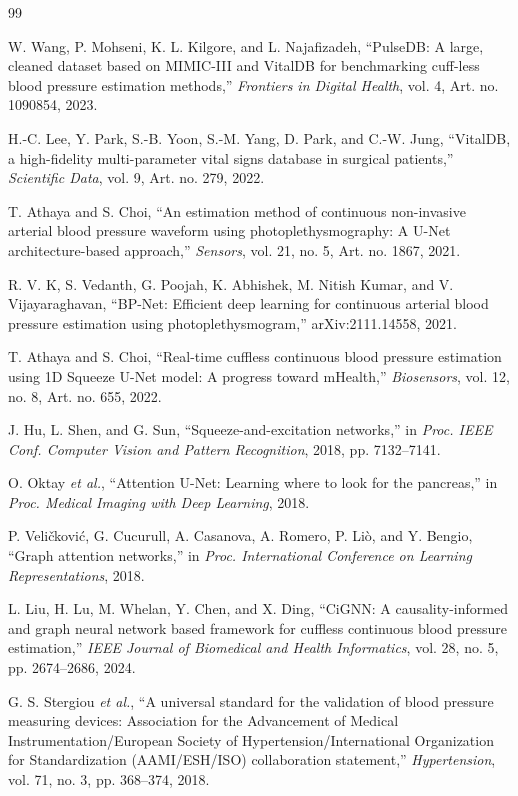\documentclass[journal,twoside,web]{ieeecolor}
\begin{document}
\begin{thebibliography}{99}

W. Wang, P. Mohseni, K. L. Kilgore, and L. Najafizadeh, ``PulseDB: A large, cleaned dataset based on MIMIC-III and VitalDB for benchmarking cuff-less blood pressure estimation methods,'' \emph{Frontiers in Digital Health}, vol. 4, Art. no. 1090854, 2023.

H.-C. Lee, Y. Park, S.-B. Yoon, S.-M. Yang, D. Park, and C.-W. Jung, ``VitalDB, a high-fidelity multi-parameter vital signs database in surgical patients,'' \emph{Scientific Data}, vol. 9, Art. no. 279, 2022.

T. Athaya and S. Choi, ``An estimation method of continuous non-invasive arterial blood pressure waveform using photoplethysmography: A U-Net architecture-based approach,'' \emph{Sensors}, vol. 21, no. 5, Art. no. 1867, 2021.

R. V. K, S. Vedanth, G. Poojah, K. Abhishek, M. Nitish Kumar, and V. Vijayaraghavan, ``BP-Net: Efficient deep learning for continuous arterial blood pressure estimation using photoplethysmogram,'' arXiv:2111.14558, 2021.

T. Athaya and S. Choi, ``Real-time cuffless continuous blood pressure estimation using 1D Squeeze U-Net model: A progress toward mHealth,'' \emph{Biosensors}, vol. 12, no. 8, Art. no. 655, 2022.

J. Hu, L. Shen, and G. Sun, ``Squeeze-and-excitation networks,'' in \emph{Proc. IEEE Conf. Computer Vision and Pattern Recognition}, 2018, pp. 7132--7141.

O. Oktay \emph{et al.}, ``Attention U-Net: Learning where to look for the pancreas,'' in \emph{Proc. Medical Imaging with Deep Learning}, 2018.

P. Veli\v{c}kovi\'c, G. Cucurull, A. Casanova, A. Romero, P. Li\`o, and Y. Bengio, ``Graph attention networks,'' in \emph{Proc. International Conference on Learning Representations}, 2018.

L. Liu, H. Lu, M. Whelan, Y. Chen, and X. Ding, ``CiGNN: A causality-informed and graph neural network based framework for cuffless continuous blood pressure estimation,'' \emph{IEEE Journal of Biomedical and Health Informatics}, vol. 28, no. 5, pp. 2674--2686, 2024.

G. S. Stergiou \emph{et al.}, ``A universal standard for the validation of blood pressure measuring devices: Association for the Advancement of Medical Instrumentation/European Society of Hypertension/International Organization for Standardization (AAMI/ESH/ISO) collaboration statement,'' \emph{Hypertension}, vol. 71, no. 3, pp. 368--374, 2018.

\end{thebibliography}
\end{document}
